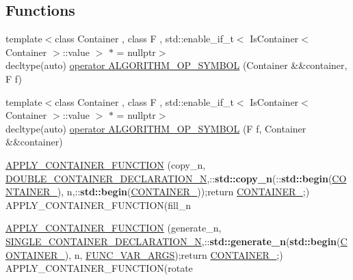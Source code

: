\subsection*{Functions}
\begin{DoxyCompactItemize}
\item 
{\footnotesize template$<$class Container , class F , std\+::enable\+\_\+if\+\_\+t$<$ Is\+Container$<$ Container $>$\+::value $>$ $\ast$  = nullptr$>$ }\\decltype(auto) \hyperlink{namespacehandy_af239d82057c5a6124b597ddcbb5141af}{operator A\+L\+G\+O\+R\+I\+T\+H\+M\+\_\+\+O\+P\+\_\+\+S\+Y\+M\+B\+OL} (Container \&\&container, F f)
\item 
{\footnotesize template$<$class Container , class F , std\+::enable\+\_\+if\+\_\+t$<$ Is\+Container$<$ Container $>$\+::value $>$ $\ast$  = nullptr$>$ }\\decltype(auto) \hyperlink{namespacehandy_a604ac43ad3b993dcd0a4d8f548c017c7}{operator A\+L\+G\+O\+R\+I\+T\+H\+M\+\_\+\+O\+P\+\_\+\+S\+Y\+M\+B\+OL} (F f, Container \&\&container)
\item 
\hyperlink{namespacehandy_ad41cc2aee368e2b1b1021498160f511d}{A\+P\+P\+L\+Y\+\_\+\+C\+O\+N\+T\+A\+I\+N\+E\+R\+\_\+\+F\+U\+N\+C\+T\+I\+ON} (copy\+\_\+n, \hyperlink{Algorithms_8h_a1710716f622efa68abc209e9c6d213e8}{D\+O\+U\+B\+L\+E\+\_\+\+C\+O\+N\+T\+A\+I\+N\+E\+R\+\_\+\+D\+E\+C\+L\+A\+R\+A\+T\+I\+O\+N\+\_\+N},\+::{\bf std\+::copy\+\_\+n}(\+::{\bf std\+::begin}(\hyperlink{namespacehandy_a233c0491c05c437359a4404cd9b94fcc}{C\+O\+N\+T\+A\+I\+N\+E\+R\+\_}), n,\+::{\bf std\+::begin}(\hyperlink{Algorithms_8h_acfc307df20cf90e1c270a9c1614d5e9e}{C\+O\+N\+T\+A\+I\+N\+E\+R\+\_}));return \hyperlink{Algorithms_8h_acfc307df20cf90e1c270a9c1614d5e9e}{C\+O\+N\+T\+A\+I\+N\+E\+R\+\_};) A\+P\+P\+L\+Y\+\_\+\+C\+O\+N\+T\+A\+I\+N\+E\+R\+\_\+\+F\+U\+N\+C\+T\+I\+ON(fill\+\_\+n
\item 
\hyperlink{namespacehandy_aa87afa981327c829540a4da26dcc33ad}{A\+P\+P\+L\+Y\+\_\+\+C\+O\+N\+T\+A\+I\+N\+E\+R\+\_\+\+F\+U\+N\+C\+T\+I\+ON} (generate\+\_\+n, \hyperlink{namespacehandy_a0bbcc72407282157424193da360bfa2b}{S\+I\+N\+G\+L\+E\+\_\+\+C\+O\+N\+T\+A\+I\+N\+E\+R\+\_\+\+D\+E\+C\+L\+A\+R\+A\+T\+I\+O\+N\+\_\+N},\+::{\bf std\+::generate\+\_\+n}({\bf std\+::begin}(\hyperlink{namespacehandy_a233c0491c05c437359a4404cd9b94fcc}{C\+O\+N\+T\+A\+I\+N\+E\+R\+\_}), n, \hyperlink{Algorithms_8h_ab87d0dee85e25fa6699760357a3a6aed}{F\+U\+N\+C\+\_\+\+V\+A\+R\+\_\+\+A\+R\+GS});return \hyperlink{namespacehandy_a233c0491c05c437359a4404cd9b94fcc}{C\+O\+N\+T\+A\+I\+N\+E\+R\+\_};) A\+P\+P\+L\+Y\+\_\+\+C\+O\+N\+T\+A\+I\+N\+E\+R\+\_\+\+F\+U\+N\+C\+T\+I\+ON(rotate

\end{DoxyCompactItemize}
